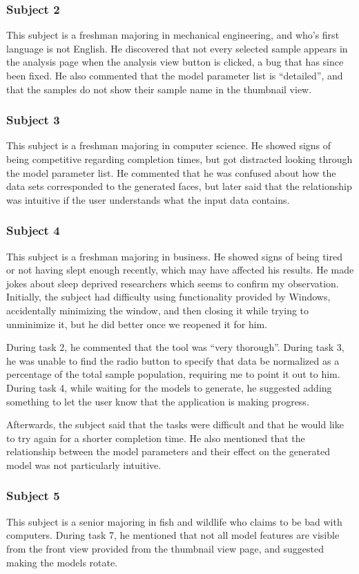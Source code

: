 \documentclass[letterpaper,10pt, onecolumn, draftclsnofoot]{IEEEtran}
\begin{document}
\subsubsection{Subject 2}
This subject is a freshman majoring in mechanical engineering, and who's first language is not English. He discovered that not every selected sample appears in the analysis page when the analysis view button is clicked, a bug that has since been fixed. He also commented that the model parameter list is ``detailed'', and that the samples do not show their sample name in the thumbnail view.

\subsubsection{Subject 3}
This subject is a freshman majoring in computer science. He showed signs of being competitive regarding completion times, but got distracted looking through the model parameter list. He commented that he was confused about how the data sets corresponded to the generated faces, but later said that the relationship was intuitive if the user understands what the input data contains.

\subsubsection{Subject 4}
This subject is a freshman majoring in business. He showed signs of being tired or not having slept enough recently, which may have affected his results. He made jokes about sleep deprived researchers which seems to confirm my observation. Initially, the subject had difficulty using functionality provided by Windows, accidentally minimizing the window, and then closing it while trying to unminimize it, but he did better once we reopened it for him. 

During task 2, he commented that the tool was ``very thorough''. During task 3, he was unable to find the radio button to specify that data be normalized as a percentage of the total sample population, requiring me to point it out to him. During task 4, while waiting for the models to generate, he suggested adding something to let the user know that the application is making progress.

Afterwards, the subject said that the tasks were difficult and that he would like to try again for a shorter completion time. He also mentioned that the relationship between the model parameters and their effect on the generated model was not particularly intuitive.

\subsubsection{Subject 5}
This subject is a senior majoring in fish and wildlife who claims to be bad with computers. During task 7, he mentioned that not all model features are visible from the front view provided from the thumbnail view page, and suggested making the models rotate.
\end{document}

